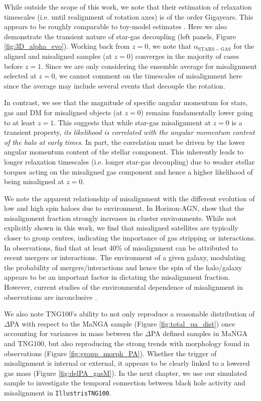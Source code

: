 While outside the scope of this work, we note that their estimation of relaxation timescales (i.e. until realignment of rotation axes) is of the order Gigayears. This appears to be roughly comparable to toy-model estimates \citep[see;][albeit for ETGs]{davis2016}. Here we also demonstrate the transient nature of star-gas decoupling (left panels, Figure \ref{fig:3D_alpha_evo}). Working back from $z=0$, we note that $\mathrm{\alpha_{STARS - GAS}}$ for the aligned and misaligned samples (at $z=0$) converges in the majority of cases before $z=1$. Since we are only considering the ensemble average for misalignment selected at $z=0$, we cannot comment on the timescales of misalignment here since the average may include several events that decouple the rotation.

In contrast, we see that the magnitude of specific angular momentum for stars, gas and DM for misaligned objects (at $z=0$) remains fundamentally lower going to at least $z=1$. This suggests that while star-gas misalignment at $z=0$ is a transient property, \textit{its likelihood is correlated with the angular momentum content of the halo at early times}. In part, the correlation must be driven by the lower angular momentum content of the stellar component. This inherently leads to longer relaxation timescales (i.e. longer star-gas decoupling) due to weaker stellar torques acting on the misaligned gas component and hence a higher likelihood of being misaligned at $z=0$.

We note the apparent relationship of misalignment with the different evolution of low and high spin haloes due to environment. In Horizon-AGN, \citet{khim2019} show that the misalignment fraction strongly increases in cluster environments. While not explicitly shown in this work, we find that misaligned satellites are typically closer to group centres, indicating the importance of gas stripping or interactions. In observations, \citet{li2019} find that at least 40\% of misalignment can be attributed to recent mergers or interactions. The environment of a given galaxy, modulating the probability of mergers/interactions and hence the spin of the halo/galaxy appears to be an important factor in dictating the misalignment fraction. However, current studies of the environmental dependence of misalignment in observations are inconclusive \citep[e.g. preference for misalignment in overdensity vs isolation; Chapter 5 vs][]{jin2016}.

We also note TNG100's ability to not only reproduce a reasonable distribution of $\Delta$PA with respect to the MaNGA sample (Figure \ref{fig:total_pa_dist}) once accounting for variances in mass between the $\Delta$PA defined samples in MaNGA and TNG100, but also reproducing the strong trends with morphology found in observations (Figure \ref{fig:group_morph_PA}). Whether the trigger of misalignment is internal or external, it appears to be clearly linked to a lowered gas mass (Figure \ref{fig:delPA_gasM}). In the next chapter, we use our simulated sample to investigate the temporal connection between black hole activity and misalignment in \texttt{IllustrisTNG100}. 